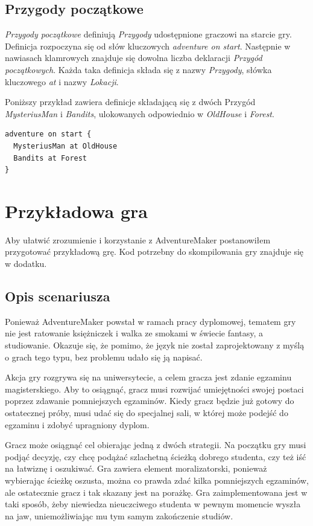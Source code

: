 \documentclass[openright]{xmgr}
\begin{document}
\section{Przygody początkowe} 
\textit{Przygody początkowe} definiują \textit{Przygody} udostępnione graczowi na starcie gry. Definicja rozpoczyna się od słów kluczowych \textit{adventure on start}. Następnie w nawiasach klamrowych znajduje się dowolna liczba deklaracji \textit{Przygód początkowych}.
Każda taka definicja składa się z nazwy \textit{Przygody}, słówka kluczowego \textit{at} i nazwy \textit{Lokacji}.

Poniższy przykład zawiera definicje składającą się z dwóch Przygód \textit{MysteriusMan} i \textit{Bandits}, ulokowanych odpowiednio w \textit{OldHouse} i \textit{Forest}.

\begin{verbatim}
adventure on start {
  MysteriusMan at OldHouse
  Bandits at Forest
}
\end{verbatim}

\chapter{Przykładowa gra}
Aby ułatwić zrozumienie i korzystanie z AdventureMaker postanowiłem przygotować przykładową grę. Kod potrzebny do skompilowania gry znajduje się w dodatku.

\section{Opis scenariusza}

Ponieważ AdventureMaker powstał w ramach pracy dyplomowej, tematem gry nie jest ratowanie księżniczek i walka ze smokami w świecie fantasy, a studiowanie. Okazuje się, że pomimo, że język nie został zaprojektowany z myślą o grach tego typu, bez problemu udało się ją napisać.

Akcja gry rozgrywa się na uniwersytecie, a celem gracza jest zdanie egzaminu magisterskiego. Aby to osiągnąć, gracz musi rozwijać umiejętności swojej postaci poprzez zdawanie pomniejszych egzaminów. Kiedy gracz będzie już gotowy do ostatecznej próby, musi udać się do specjalnej sali, w której może podejść do egzaminu i zdobyć upragniony dyplom.

Gracz może osiągnąć cel obierając jedną z dwóch strategii. Na początku gry musi podjąć decyzję, czy chcę podążać szlachetną ścieżką dobrego studenta, czy też iść na łatwiznę i oszukiwać. Gra zawiera element moralizatorski, ponieważ wybierając ścieżkę oszusta, można co prawda zdać kilka pomniejszych egzaminów, ale ostatecznie gracz i tak skazany jest na porażkę. Gra zaimplementowana jest w taki sposób, żeby niewiedza nieuczciwego studenta w pewnym momencie wyszła na jaw, uniemożliwiając mu tym samym zakończenie studiów.
\end{document}
